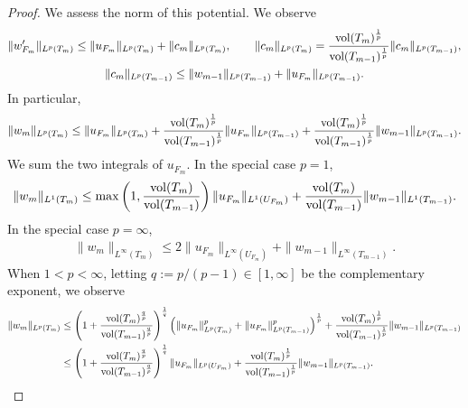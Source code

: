 \documentclass[12pt,a4paper]{article}
\begin{document}
\begin{proof}
 We assess the norm of this potential. We observe 
 \begin{gather*}
    \| w'_{F_m} \|_{L^{p}(T_m)}
    \leq 
    \| u_{F_m} \|_{L^{p}(T_m)}
    +
    \| c_{m} \|_{L^{p}(T_m)},
    \qquad 
    \| c_{m} \|_{L^{p}(T_m)}
    = 
    \frac{ \operatorname{vol}(T_m)^{\frac 1 p} }{ \operatorname{vol}(T_{{m-1}})^{\frac 1 p} }
    \| c_{m} \|_{L^{p}(T_{{m-1}})},
    \\ 
    \| c_{m} \|_{L^{p}(T_{{m-1}})}
    \leq 
    \| w_{m-1}\|_{L^{p}(T_{{m-1}})} + \| u_{F_{m}} \|_{L^{p}(T_{{m-1}})} 
    .
 \end{gather*}
 In particular,
 \begin{align*}
    \| w_{m} \|_{L^{p}(T_m)}
    \leq 
    \| u_{F_m} \|_{L^{p}(T_m)}
    +
    \frac{ \operatorname{vol}(T_m)^{\frac 1 p} }{ \operatorname{vol}(T_{{m-1}})^{\frac 1 p} }
    \| u_{F_{m}} \|_{L^{p}(T_{{m-1}})}
    +
    \frac{ \operatorname{vol}(T_m)^{\frac 1 p} }{ \operatorname{vol}(T_{{m-1}})^{\frac 1 p} }
    \| w_{m-1}\|_{L^{p}(T_{{m-1}})}
    .
 \end{align*}
 We sum the two integrals of $u_{F_m}$. 
 In the special case $p=1$,
 \begin{align*}
    \| w_{m} \|_{L^{1}(T_m)}
    \leq 
    \max\left(
        1, \frac{ \operatorname{vol}(T_m) }{ \operatorname{vol}(T_{{m-1}}) } 
    \right)
    \| u_{F_m} \|_{L^{1}(U_{F_m})}
    +
    \frac{ \operatorname{vol}(T_m) }{ \operatorname{vol}(T_{{m-1}}) }
    \| w_{m-1}\|_{L^{1}(T_{{m-1}})}
    .
 \end{align*}
 In the special case $p=\infty$, 
 \begin{align*}
    \| w_{m} \|_{L^{\infty}(T_m)}
    \leq 
    2
    \| u_{F_m} \|_{L^{\infty}(U_{F_m})}
    +
    \| w_{m-1}\|_{L^{\infty}(T_{{m-1}})}
    .
 \end{align*}
 When $1 < p < \infty$, letting $q := p/(p-1) \in [1,\infty]$ be the complementary exponent, we observe 
 \begin{align*}
    \| w_{m} \|_{L^{p}(T_m)}
    &\leq 
    \left( 1 + \frac{ \operatorname{vol}(T_m)^{\frac q p} }{ \operatorname{vol}(T_{{m-1}})^{\frac q p} } \right)^{\frac 1 q}
    \left( 
        \| u_{F_m} \|_{L^{p}(T_m)}^{p}
        +
        \| u_{F_{m}} \|_{L^{p}(T_{{m-1}})}^{p}
    \right)^{\frac 1 p}
    +
    \frac{ \operatorname{vol}(T_m)^{\frac 1 p} }{ \operatorname{vol}(T_{{m-1}})^{\frac 1 p} }
    \| w_{m-1}\|_{L^{p}(T_{{m-1}})}
    \\&\leq 
    \left( 1 + \frac{ \operatorname{vol}(T_m)^{\frac q p} }{ \operatorname{vol}(T_{{m-1}})^{\frac q p} } \right)^{\frac 1 q}
    \| u_{F_m} \|_{L^{p}(U_{F_m})} 
    +
    \frac{ \operatorname{vol}(T_m)^{\frac 1 p} }{ \operatorname{vol}(T_{{m-1}})^{\frac 1 p} }
    \| w_{m-1}\|_{L^{p}(T_{{m-1}})}
    .
 \end{align*}

\end{proof}
\end{document}
